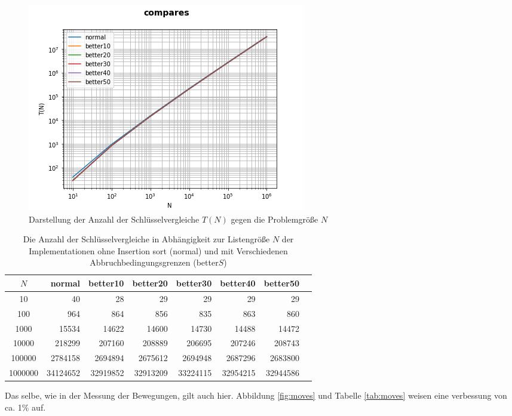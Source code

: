 \documentclass[
   draft=false
  ,paper=a4
  ,twoside=false
  ,fontsize=11pt
  ,headsepline
  ,DIV=11
  ,parskip=full+
  ,titlepage
]{scrartcl} %
\begin{document}
\begin{figure}[htp]
  \centering
  \includegraphics[width=\textwidth]{../compares.png}
  \caption[Vergleiche]{Darstellung der Anzahl der Schlüsselvergleiche 
  $T(N)$ gegen die Problemgröße $N$}
  \label{fig:compares}
\end{figure}

\begin{table}[htp]
  \centering
  \caption[Vergleiche]{Die Anzahl der Schlüsselvergleiche in Abhängigkeit 
  zur Listengröße $N$ der Implementationen ohne Insertion sort (normal) und
  mit Verschiedenen Abbruchbedingungsgrenzen (better$S$)}
  \label{tab:compare}
  \begin{tabular}{|c|r|r|r|r|r|r|r|}
  \hline
  $N$ & normal & better10 & better20 & better30 & better40 & better50 \\
  \hline
  10 & 40 & 28 & 29 & 29 & 29 & 29 \\
100 & 964 & 864 & 856 & 835 & 863 & 860 \\
1000 & 15534 & 14622 & 14600 & 14730 & 14488 & 14472 \\
10000 & 218299 & 207160 & 208889 & 206695 & 207246 & 208743 \\ 
100000 & 2784158 & 2694894 & 2675612 & 2694948 & 2687296 & 2683800 \\
1000000 & 34124652 & 32919852 & 32913209 & 33224115 & 32954215 & 32944586 \\
\hline
  \end{tabular}
\end{table}

Das selbe, wie in der Messung der Bewegungen, gilt auch hier. Abbildung \ref{fig:moves} und Tabelle \ref{tab:moves} weisen eine verbessung von ca. 1\% auf. 
\end{document}
